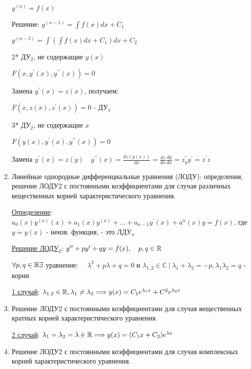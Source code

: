 \documentclass[12pt]{article}
\begin{document}
\begin{enumerate}
        $y^{(n)} = f(x)$

        Решение: $y^{(n - 1)} = \int f(x) dx + C_1$

        $y^{(n - 2)} = \int (\int f(x) dx + C_1) dx + C_2$

        2* ДУ$_2$, не содержащие $y(x)$

        $F(x, y^\prime(x), y^{\prime\prime}(x)) = 0$

        Замена $y^\prime(x) = z(x)$, получаем:

        $F(x, z(x), z^\prime(x)) = 0$ - ДУ$_1$

        3* ДУ$_2$, не содержащие $x$

        $F(y(x), y^\prime(x), y^{\prime\prime}(x)) = 0$

        Замена $y^\prime(x) = z(y) \quad y^{\prime\prime}(x) = \frac{dz(y(x))}{dx} = \frac{dz}{dx} \frac{dy}{dx} = z^\prime_y y^\prime = z^\prime z$


        \item Линейные однородные дифференциальные уравнения (ЛОДУ): определения, решение ЛОДУ2 с постоянными коэффициентами для случая различных вещественных корней характеристического уравнения.

        \hyperlink{lineardifferentialequationhigherdegree}{Определение}: $a_0(x) y^{(n)}(x) + a_1(x)y^{(x)} + \dots + a_{n - 1}y^\prime(x) + a^n(x)y = f(x)$, где $y = y(x)$ - неизв. функция, - это ЛДУ$_n$

        \hyperlink{lineardifferentialequationseconddegreewithconstants}{Решение ЛОДУ$_2$}: $y^{\prime\prime} + p y^\prime + q y = f(x), \quad p, q \in \mathbb{R}$

        $\forall p, q \in \mathbb{R} \exists $ уравнение: $\quad \lambda^2 + p\lambda + q = 0$ и $\lambda_{1,2} \in \mathbb{C} \ | \ \lambda_1 + \lambda_2 = -p, \lambda_1 \lambda_2 = q$ - корни

        \hyperlink{ldesgdifferentrealsolutions}{1 случай}: $\lambda_{1.2} \in \mathbb{R}, \lambda_1 \neq \lambda_2 \Longrightarrow y(x) = C_1 e^{\lambda_1 x} + C^2 e^{\lambda_2 x}$

        \item Решение ЛОДУ2 с постоянными коэффициентами для случая вещественных кратных корней характеристического уравнения.

        \hyperlink{ldesgequalrealsolutions}{2 случай}: $\lambda_1 = \lambda_2 = \lambda \in \mathbb{R} \Longrightarrow y(x) = (C_1 x + C_2)e^{\lambda x}$


        \item Решение ЛОДУ2 с постоянными коэффициентами для случая комплексных корней характеристического уравнения.


\end{enumerate}
\end{document}
